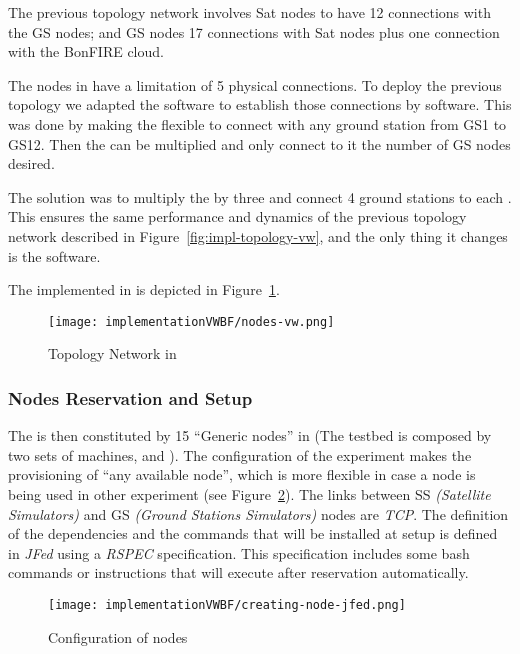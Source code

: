 The previous topology network involves Sat nodes to have 12 connections with the GS nodes; and GS nodes 17 connections with Sat nodes plus one connection with the BonFIRE cloud.

The nodes in \vw have a limitation of 5 physical connections. To deploy the previous
topology we adapted the \sss software to establish those connections by software. This was
done by making the \satss flexible to connect with any ground station from GS1 to GS12. Then the \satss can be multiplied and only connect to it the number of GS nodes desired. 

The solution was to multiply the \satss by three and connect 4 ground stations to each \satss. This ensures the same performance and dynamics of the previous topology network described in Figure~\ref{fig:impl-topology-vw}, and the only thing it changes is the software.

The \sss implemented in \vw is depicted in Figure~\ref{fig:impl-nodes-vw}.

\begin{figure}[!h]
\begin{center}
\texttt{[image: implementationVWBF/nodes-vw.png]}

\caption{Topology Network in \vw}
\label{fig:impl-nodes-vw}
\end{center}
\end{figure}



\subsubsection{Nodes Reservation and Setup}


The \sss is then constituted by 15 ``Generic nodes'' in  (The \vw
testbed is composed by two sets of machines,  and ). The configuration of the experiment makes the provisioning of ``any available node'',
which is more flexible in case a node is being used in other experiment (see Figure~\ref{fig:creating-node-jfed}). The links between SS \emph{(Satellite Simulators)} and GS \emph{(Ground Stations Simulators)} nodes
are \emph{TCP}. The definition of the dependencies and the commands that will be installed at
setup is defined in \emph{JFed} using a \emph{RSPEC} specification. This specification includes some
bash commands or instructions that will execute after reservation automatically.


\begin{figure}[!h]
\begin{center}
\texttt{[image: implementationVWBF/creating-node-jfed.png]}

\caption{Configuration of \vw nodes}
\label{fig:creating-node-jfed}
\end{center}
\end{figure}


